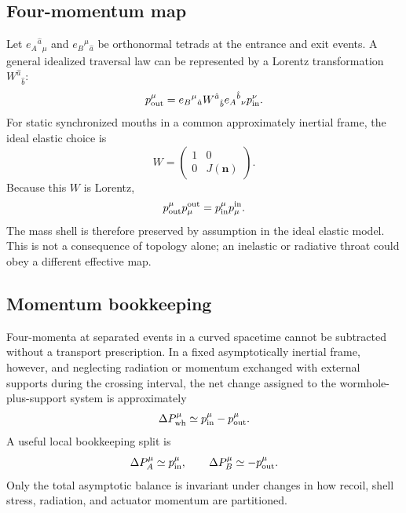 \documentclass[journal,a4paper]{IEEEtran}
\begin{document}
\subsection{Four-momentum map}

Let \(e_A{}^{\hat a}{}_{\mu}\) and \(e_B{}^{\mu}{}_{\hat a}\) be orthonormal tetrads at the entrance and exit events. A general idealized traversal law can be represented by a Lorentz transformation \(W^{\hat a}{}_{\hat b}\):
\begin{equation}
    p_{\rm out}^{\mu}
    =e_B{}^{\mu}{}_{\hat a}
    W^{\hat a}{}_{\hat b}
    e_A{}^{\hat b}{}_{\nu}
    p_{\rm in}^{\nu}.
    \label{eq:four_momentum_map}
\end{equation}
For static synchronized mouths in a common approximately inertial frame, the ideal elastic choice is
\begin{equation}
    W=
    \begin{pmatrix}
        1&0\\
        0&J(\mathbf n)
    \end{pmatrix}.
    \label{eq:static_W}
\end{equation}
Because this \(W\) is Lorentz,
\begin{equation}
    p_{\rm out}^{\mu}p^{\rm out}_{\mu}
    =p_{\rm in}^{\mu}p^{\rm in}_{\mu}.
\end{equation}
The mass shell is therefore preserved by assumption in the ideal elastic model. This is not a consequence of topology alone; an inelastic or radiative throat could obey a different effective map.

\subsection{Momentum bookkeeping}

Four-momenta at separated events in a curved spacetime cannot be subtracted without a transport prescription. In a fixed asymptotically inertial frame, however, and neglecting radiation or momentum exchanged with external supports during the crossing interval, the net change assigned to the wormhole-plus-support system is approximately
\begin{equation}
    \Delta P_{\rm wh}^{\mu}
    \simeq p_{\rm in}^{\mu}-p_{\rm out}^{\mu}.
    \label{eq:wormhole_impulse}
\end{equation}
A useful local bookkeeping split is
\begin{equation}
    \Delta P_A^{\mu}\simeq p_{\rm in}^{\mu},
    \qquad
    \Delta P_B^{\mu}\simeq-p_{\rm out}^{\mu}.
\end{equation}
Only the total asymptotic balance is invariant under changes in how recoil, shell stress, radiation, and actuator momentum are partitioned.
\end{document}

